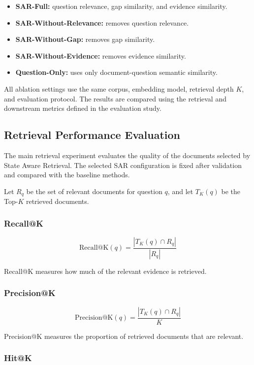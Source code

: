 \documentclass[12pt,a4paper]{report}
\begin{document}
\begin{itemize}[leftmargin=0.25in,itemsep=0.06in,parsep=0pt]
\item \textbf{SAR-Full:} question relevance, gap similarity, and evidence similarity.
\item \textbf{SAR-Without-Relevance:} removes question relevance.
\item \textbf{SAR-Without-Gap:} removes gap similarity.
\item \textbf{SAR-Without-Evidence:} removes evidence similarity.
\item \textbf{Question-Only:} uses only document-question semantic similarity.
\end{itemize}

All ablation settings use the same corpus, embedding model, retrieval
depth $K$, and evaluation protocol. The results are compared using the
retrieval and downstream metrics defined in the evaluation study.

\subsection{Retrieval Performance Evaluation}

The main retrieval experiment evaluates the quality of the documents
selected by State Aware Retrieval. The selected SAR configuration is
fixed after validation and compared with the baseline methods.

Let $R_q$ be the set of relevant documents for question $q$, and let
$T_K(q)$ be the Top-$K$ retrieved documents.

\subsubsection{Recall@K}

\[
\mathrm{Recall@K}(q)
=
\frac{|T_K(q)\cap R_q|}
{|R_q|}
\]

Recall@K measures how much of the relevant evidence is retrieved.

\subsubsection{Precision@K}

\[
\mathrm{Precision@K}(q)
=
\frac{|T_K(q)\cap R_q|}
{K}
\]

Precision@K measures the proportion of retrieved documents that are
relevant.

\subsubsection{Hit@K}
\end{document}
